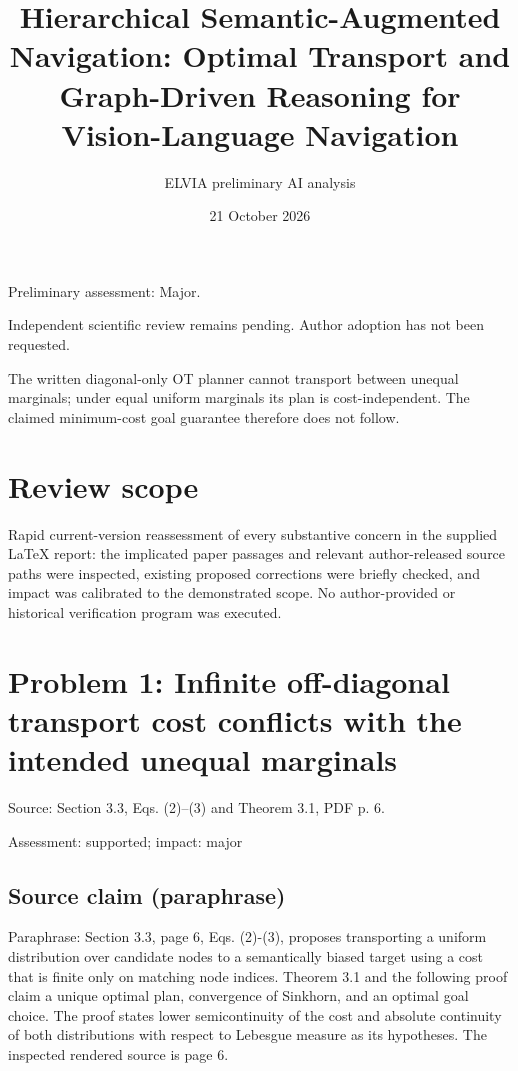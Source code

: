 \documentclass[11pt]{article}
\begin{document}
\title{Hierarchical Semantic-Augmented Navigation: Optimal Transport and Graph-Driven Reasoning for Vision-Language Navigation}

\author{ELVIA preliminary AI analysis}\date{21 October 2026}\maketitle

Preliminary assessment: Major.\par

Independent scientific review remains pending. Author adoption has not been requested.

The written diagonal-only OT planner cannot transport between unequal marginals; under equal uniform marginals its plan is cost-independent. The claimed minimum-cost goal guarantee therefore does not follow.

\section*{Review scope}

Rapid current-version reassessment of every substantive concern in the supplied LaTeX report: the implicated paper passages and relevant author-released source paths were inspected, existing proposed corrections were briefly checked, and impact was calibrated to the demonstrated scope. No author-provided or historical verification program was executed.

\section*{Problem 1: Infinite off-diagonal transport cost conflicts with the intended unequal marginals}

Source: Section 3.3, Eqs. (2)–(3) and Theorem 3.1, PDF p. 6.

Assessment: supported; impact: major

\subsection*{Source claim (paraphrase)}

Paraphrase: Section 3.3, page 6, Eqs. (2)-(3), proposes transporting a uniform distribution over candidate nodes to a semantically biased target using a cost that is finite only on matching node indices. Theorem 3.1 and the following proof claim a unique optimal plan, convergence of Sinkhorn, and an optimal goal choice. The proof states lower semicontinuity of the cost and absolute continuity of both distributions with respect to Lebesgue measure as its hypotheses. The inspected rendered source is page 6.
\end{document}
